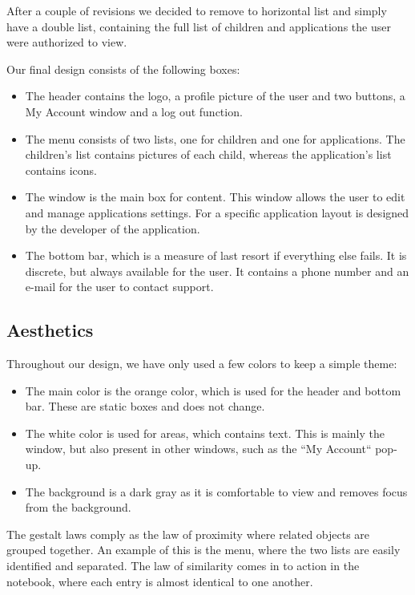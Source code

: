 \documentclass[12pt]{article}
\begin{document}

After a couple of revisions we decided to remove to horizontal list and simply have a double list, containing the full list of children and applications the user were authorized to view. 


Our final design consists of the following boxes:
\begin{itemize}
 \item The header contains the logo, a profile picture of the user and two buttons, a My Account window and a log out function.
 \item The menu consists of two lists, one for children and one for applications. The children's list contains pictures of each child, whereas the application's list contains icons. 
 \item The window is the main box for content. This window allows the user to edit and manage applications settings. For a specific application layout is designed by the developer of the application.
 \item The bottom bar, which is a measure of last resort if everything else fails. It is discrete, but always available for the user. It contains a phone number and an e-mail for the user to contact support.
\end{itemize}


\subsection*{Aesthetics}
Throughout our design, we have only used a few colors to keep a simple theme:
\begin{itemize}
 \item The main color is the orange color, which is used for the header and bottom bar. These are static boxes and does not change.
 \item The white color is used for areas, which contains text. This is mainly the window, but also present in other windows, such as the ``My Account`` pop-up.
 \item The background is a dark gray as it is comfortable to view and removes focus from the background. 
\end{itemize}

The gestalt laws comply as the law of proximity where related objects are grouped together. An example of this is the menu, where the two lists are easily identified and separated. The law of similarity comes in to action in the notebook, where each entry is almost identical to one another.
\end{document}

